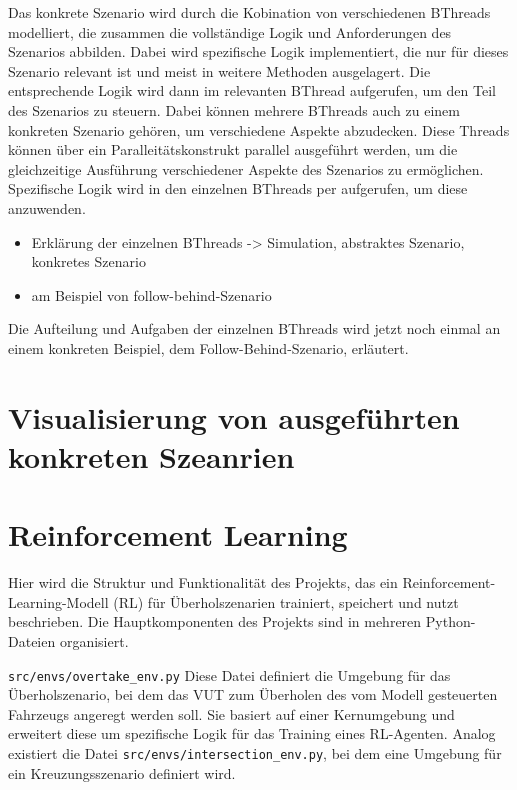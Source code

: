 Das konkrete Szenario wird durch die Kobination von verschiedenen BThreads modelliert, die zusammen die vollständige Logik und Anforderungen des Szenarios abbilden. Dabei wird spezifische Logik implementiert, die nur für dieses Szenario relevant ist und meist in weitere Methoden ausgelagert.
Die entsprechende Logik wird dann im relevanten BThread aufgerufen, um den Teil des Szenarios zu steuern. Dabei können mehrere BThreads auch zu einem konkreten Szenario gehören, um verschiedene Aspekte abzudecken.
Diese Threads können über ein Paralleitätskonstrukt parallel ausgeführt werden, um die gleichzeitige Ausführung verschiedener Aspekte des Szenarios zu ermöglichen. Spezifische Logik wird in den einzelnen BThreads per  aufgerufen, um diese anzuwenden.
\begin{itemize}
    \item Erklärung der einzelnen BThreads -> Simulation, abstraktes Szenario, konkretes Szenario
    \item am Beispiel von follow-behind-Szenario
\end{itemize}

Die Aufteilung und Aufgaben der einzelnen BThreads wird jetzt noch einmal an einem konkreten Beispiel, dem Follow-Behind-Szenario, erläutert.

\section{Visualisierung von ausgeführten konkreten Szeanrien}
\section{Reinforcement Learning}
Hier wird die Struktur und Funktionalität des Projekts, das ein Reinforcement-Learning-Modell (RL) für Überholszenarien trainiert, speichert und nutzt beschrieben. Die Hauptkomponenten des Projekts sind in mehreren Python-Dateien organisiert.

\texttt{src/envs/overtake\_env.py}
Diese Datei definiert die Umgebung für das Überholszenario, bei dem das VUT zum Überholen des vom Modell gesteuerten Fahrzeugs angeregt werden soll. Sie basiert auf einer Kernumgebung und erweitert diese um spezifische Logik für das Training eines RL-Agenten.
Analog existiert die Datei \texttt{src/envs/intersection\_env.py}, bei dem eine Umgebung für ein Kreuzungsszenario definiert wird.

